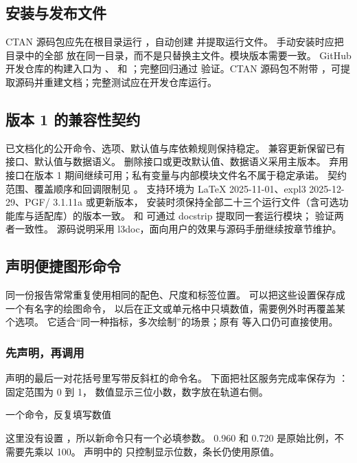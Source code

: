 \subsection{安装与发布文件}
CTAN 源码包应先在根目录运行 ，自动创建  并提取运行文件。
手动安装时应把  目录中的全部 
放在同一目录，而不是只替换主文件。模块版本需要一致。
GitHub 开发仓库的构建入口为 、 和 ；完整回归通过
 验证。CTAN 源码包不附带 ，可提取源码并重建文档；完整测试应在开发仓库运行。
\subsection{版本 1 的兼容性契约}
已文档化的公开命令、选项、默认值与库依赖规则保持稳定。
兼容更新保留已有接口、默认值与数据语义。
删除接口或更改默认值、数据语义采用主版本。
弃用接口在版本 1 期间继续可用；私有变量与内部模块文件名不属于稳定承诺。
契约范围、覆盖顺序和回调限制见 。
支持环境为 LaTeX 2025-11-01、expl3 2025-12-29、PGF/\manualTikZ{} 3.1.11a 或更新版本，
安装时须保持全部二十三个运行文件（含可选功能库与适配库）的版本一致。
 和  可通过 docstrip 提取同一套运行模块；
 验证两者一致性。
源码说明采用 l3doc，面向用户的效果与源码手册继续按章节维护。

\clearpage
\subsection{声明便捷图形命令}
\label{sec:command-declarations-cn}
同一份报告常常重复使用相同的配色、尺度和标签位置。
\key{\gradbarsnewcommand} 可以把这些设置保存成一个有名字的绘图命令，
以后在正文或单元格中只填数值，需要例外时再覆盖某个选项。
它适合“同一种指标，多次绘制”的场景；原有 \key{\gradbar} 等入口仍可直接使用。

\subsubsection{先声明，再调用}
声明的最后一对花括号里写带反斜杠的命令名。
下面把社区服务完成率保存为 \key{\servicebar}：固定范围为 0 到 1，
数值显示三位小数，数字放在轨道右侧。
\begin{example}[text and listing,sidebyside=false]{一个命令，反复填写数值}
\begingroup
\gradbarsnewcommand[
  type=bar,theme=gray,min=0,max=1,
  width=25mm,height=5pt,precision=3,
  label position=right,label distance=1mm
]{\servicebar}
\qquad{}
\endgroup
\end{example}
这里没有设置 ，所以新命令只有一个必填参数。
0.960 和 0.720 是原始比例，不需要先乘以 100。
声明中的  只控制显示位数，条长仍使用原值。

